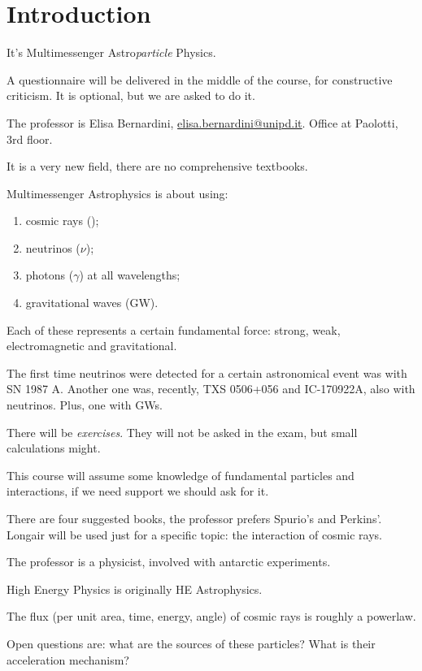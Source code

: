 \documentclass[main.tex]{subfiles}
\begin{document}

\section{Introduction}

It's Multimessenger Astro\emph{particle} Physics. 

A questionnaire will be delivered in the middle of the course, for constructive criticism. It is optional, but we are asked to do it. 

The professor is Elisa Bernardini, \url{elisa.bernardini@unipd.it}. Office at Paolotti, 3rd floor. 

It is a very new field, there are no comprehensive textbooks. 

Multimessenger Astrophysics is about using: 
\begin{enumerate}
  \item cosmic rays ();
  \item neutrinos (\(\nu \));
  \item photons (\(\gamma \)) at all wavelengths;
  \item gravitational waves (GW).
\end{enumerate}

Each of these represents a certain fundamental force: strong, weak, electromagnetic and gravitational.

The first time neutrinos were detected for a certain astronomical event was with SN 1987 A. 
Another one was, recently, TXS 0506+056 and IC-170922A, also with neutrinos. 
Plus, one with GWs.

There will be \emph{exercises}. 
They will not be asked in the exam, but small calculations might.

This course will assume some knowledge of fundamental particles and interactions, if we need support we should ask for it.

There are four suggested books, the professor prefers Spurio's and Perkins'. 
Longair will be used just for a specific topic: the interaction of cosmic rays. 

The professor is a physicist, involved with antarctic experiments.

High Energy Physics is originally HE Astrophysics. 

The flux (per unit area, time, energy, angle) of cosmic rays is roughly a powerlaw. 

Open questions are: what are the sources of these particles? What is their acceleration mechanism?
\end{document}
